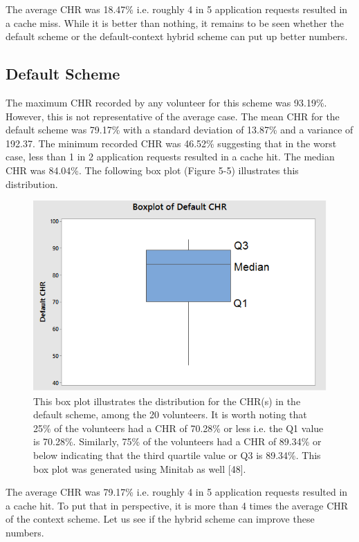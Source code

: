 \documentclass[12pt]{uthesis-v12}  %
\begin{document}
				The average CHR was 18.47\% i.e. roughly 4 in 5 application requests resulted in a cache miss. While it is better than nothing, it remains to be seen whether the default scheme or the default-context hybrid scheme can put up better numbers.	
			
			\subsection{Default Scheme}
				The maximum CHR recorded by any volunteer for this scheme was 93.19\%. However, this is not representative of the average case. The mean CHR for the default scheme was 79.17\% with a standard deviation of 13.87\% and a variance of 192.37. The minimum recorded CHR was 46.52\% suggesting that in the worst case, less than 1 in 2 application requests resulted in a cache hit. The median CHR was 84.04\%. The following box plot (Figure 5-5) illustrates this distribution.
				
				\begin{figure}[h]
					\centering
					\includegraphics[width = 130mm]{images/defaultScheme.png}
					\caption[Distribution of CHR for Default Scheme]{This box plot illustrates the distribution for the CHR(s) in the default scheme, among the 20 volunteers. It is worth noting that 25\% of the volunteers had a CHR of 70.28\% or less i.e. the Q1 value is 70.28\%. Similarly, 75\% of the volunteers had a CHR of 89.34\% or below indicating that the third quartile value or Q3 is 89.34\%. This box plot was generated using Minitab as well [48].}
				\end{figure}
				
				The average CHR was 79.17\% i.e. roughly 4 in 5 application requests resulted in a cache hit. To put that in perspective, it is more than 4 times the average CHR of the context scheme. Let us see if the hybrid scheme can improve these numbers.
				
\end{document}
